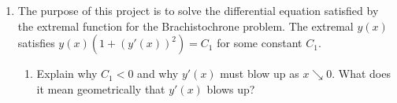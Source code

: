 \documentclass{article}
\begin{document}
\begin{enumerate}
\begin{enumerate}
                        $x\in[x_o-\mu,x_o+\mu]$.
                        \medbreak
                        Because $f$ is contained in a finite interval,
                        $\lVert f\rVert_\infty=f(x_o)$. $f$ is also continuous,
                        so there must exist some $\mu$ such that
                        $x_o\pm\mu>\lVert f\rVert_\infty \geq f(x_o)-\varepsilon$.
                  \item Prove that $\int_0^1\lvert f(x)\rvert^pdx \geq
                              2\mu(\lVert f\rVert_\infty-\varepsilon)^p$ for
                        all $p$.
                        \begin{proof}
                              \begin{align*}
                                    \int_0^1\lvert f(x)\rvert^pdx & \geq 2\mu(\lVert f\rVert_\infty-\varepsilon)^p         \\
                                    \lVert f\rVert_p^p            & \geq 2\mu(\lVert f\rVert_\infty-\varepsilon)^p         \\
                                    \lVert f\rVert_p              & \geq \sqrt[p]{2\mu}(\lVert f\rVert_\infty-\varepsilon) \\
                              \end{align*}
                        \end{proof}
                  \item Show that for $p$ large enough, $\lVert f\rVert_\infty
                              \geq \lVert f\rVert_p \geq \lVert f\rVert_\infty
                              -2\varepsilon$ and conclude that $\lim_{p\to\infty}
                              \lVert f\rVert_p = \lVert f\rVert_\infty$.
            \end{enumerate}
            \setcounter{enumi}{3}
      \item The purpose of this project is to solve the differential equation
            satisfied by the extremal function for the Brachistochrone problem.
            The extremal $y(x)$ satisfies $y(x)(1+(y'(x))^2)=C_1$ for some
            constant $C_1$.
            \begin{enumerate}
                  \item Explain why $C_1<0$ and why $y'(x)$ must blow up as
                        $x\searrow  0$. What does it mean geometrically that
                        $y'(x)$ blows up?
                        \medbreak

\end{enumerate}
\end{enumerate}
\end{document}
